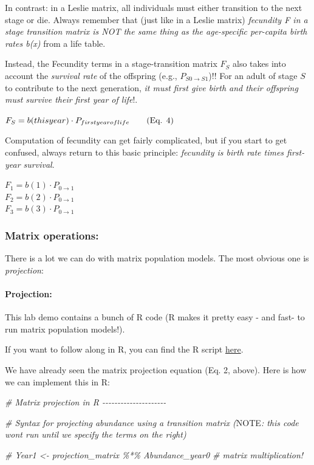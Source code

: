 \documentclass[
]{article}
\newenvironment{Shaded}{\begin{snugshade}}{\end{snugshade}}
\newcommand{\AlertTok}[1]{\textcolor[rgb]{0.94,0.16,0.16}{#1}}
\newcommand{\CommentTok}[1]{\textcolor[rgb]{0.56,0.35,0.01}{\textit{#1}}}
\begin{document}
In contrast: in a Leslie matrix, all individuals must either transition
to the next stage or die. Always remember that (just like in a Leslie
matrix) \emph{fecundity \emph{F} in a stage transition matrix is NOT the
same thing as the age-specific per-capita birth rates \emph{b(x)}} from
a life table.

Instead, the Fecundity terms in a stage-transition matrix \(F_{S}\) also
takes into account the \emph{survival rate} of the offspring (e.g.,
\(P_{S0 \rightarrow S1}\))!! For an adult of stage \(S\) to contribute
to the next generation, \emph{it must first give birth and their
offspring must survive their first year of life}!.

\(F_S = b(this \space year) \cdot P_{first \space year \space of \space life} \qquad \text{(Eq. 4)}\)

Computation of fecundity can get fairly complicated, but if you start to
get confused, always return to this basic principle: \emph{fecundity is
birth rate times first-year survival}.

\(F_1=b(1) \cdot P_{0 \rightarrow 1}\)\\
\(F_2=b(2) \cdot P_{0 \rightarrow 1}\)\\
\(F_3=b(3) \cdot P_{0 \rightarrow 1}\)

\hypertarget{matrix-operations}{%
\subsubsection{Matrix operations:}\label{matrix-operations}}

There is a lot we can do with matrix population models. The most obvious
one is \emph{projection}:

\hypertarget{projection}{%
\paragraph{Projection:}\label{projection}}

This lab demo contains a bunch of R code (R makes it pretty easy - and
fast- to run matrix population models!).

If you want to follow along in R, you can find the R script
\href{LAB4.R}{here}.

We have already seen the matrix projection equation (Eq. 2, above). Here
is how we can implement this in R:

\begin{Shaded}
\begin{Highlighting}[]
\CommentTok{\# Matrix projection in R {-}{-}{-}{-}{-}{-}{-}{-}{-}{-}{-}{-}{-}{-}{-}{-}{-}{-}{-}{-}{-}}

\CommentTok{\# Syntax for projecting abundance using a transition matrix (}\AlertTok{NOTE}\CommentTok{: this code won\textquotesingle{}t run until we specify the terms on the right)}

\CommentTok{\# Year1 \textless{}{-} projection\_matrix \%*\% Abundance\_year0  \# matrix multiplication!}
\end{Highlighting}
\end{Shaded}
\end{document}
